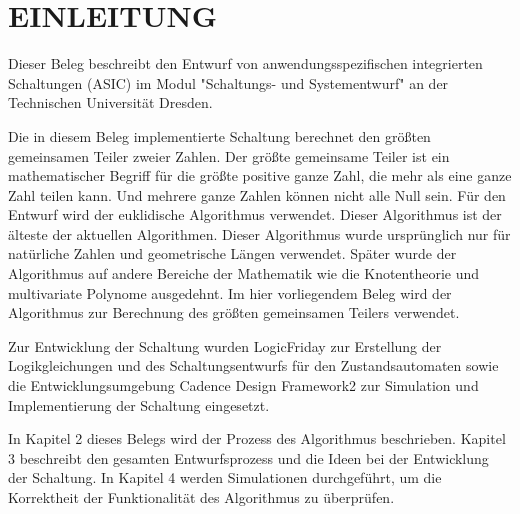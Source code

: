 \chapter{EINLEITUNG}
\label{sec:intro}

Dieser Beleg beschreibt den Entwurf von anwendungsspezifischen integrierten Schaltungen (ASIC) im Modul "Schaltungs- und Systementwurf" an der Technischen Universität Dresden\cite*{Vorlesung}.

\vspace{\baselineskip}

\noindent Die in diesem Beleg implementierte Schaltung berechnet den größten gemeinsamen Teiler zweier Zahlen. Der größte gemeinsame Teiler ist ein mathematischer Begriff für die größte positive ganze Zahl, die mehr als eine ganze Zahl teilen kann. Und mehrere ganze Zahlen können nicht alle Null sein. Für den Entwurf wird der euklidische Algorithmus verwendet. Dieser Algorithmus ist der älteste der aktuellen Algorithmen. Dieser Algorithmus wurde ursprünglich nur für natürliche Zahlen und geometrische Längen verwendet. Später wurde der Algorithmus auf andere Bereiche der Mathematik wie die Knotentheorie und multivariate Polynome ausgedehnt. Im hier vorliegendem Beleg wird der Algorithmus zur Berechnung des größten gemeinsamen Teilers verwendet.

\vspace{\baselineskip}

\noindent Zur Entwicklung der Schaltung wurden LogicFriday zur Erstellung der Logikgleichungen und des
Schaltungsentwurfs für den Zustandsautomaten sowie die Entwicklungsumgebung Cadence
Design Framework2 zur Simulation und Implementierung der Schaltung eingesetzt.

\vspace{\baselineskip}

\noindent In Kapitel 2 dieses Belegs wird der Prozess des Algorithmus beschrieben. Kapitel 3 beschreibt den gesamten Entwurfsprozess und die Ideen bei der Entwicklung der Schaltung. In Kapitel 4 werden Simulationen durchgeführt, um die Korrektheit der Funktionalität des Algorithmus zu überprüfen.

\cleardoublepage

